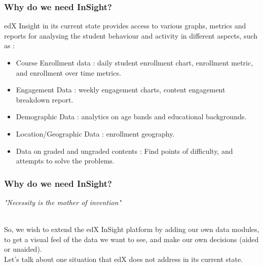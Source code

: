 \documentclass[12pt,xcolor=dvipsnames]{beamer}
\begin{document}
\begin{frame}[t]
\frametitle{Why do we need InSight?}

edX Insight in its current state provides access to various graphs, metrics and reports for analysing the student behaviour and activity in different aspects, such as :

\begin{itemize}

\item Course Enrollment data : daily student enrollment chart, enrollment metric, and enrollment over time metrics.
\item Engagement Data : weekly engagement charts, content engagement breakdown report.
\item Demographic Data : analytics on age bands and educational backgrounds.
\item Location/Geographic Data : enrollment geography.
\item Data on graded and ungraded contents : Find points of difficulty, and attempts to solve the problems.

\end{itemize}
\end{frame}



\begin{frame}[t]
\frametitle{Why do we need InSight?}

\begin{center}
\textit{\large "Necessity is the mother of invention"}
\end{center}

\hspace{20pt}
\\So, we wish to extend the edX InSight platform by adding our own data modules, to get a visual feel of the data we want to see, and make our own decisions (aided or unaided).
\vspace{30pt}
\\Let's talk about one situation that edX does not address in its current state.


\end{frame}
\end{document}
